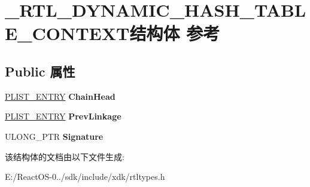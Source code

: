 \hypertarget{struct___r_t_l___d_y_n_a_m_i_c___h_a_s_h___t_a_b_l_e___c_o_n_t_e_x_t}{}\section{\+\_\+\+R\+T\+L\+\_\+\+D\+Y\+N\+A\+M\+I\+C\+\_\+\+H\+A\+S\+H\+\_\+\+T\+A\+B\+L\+E\+\_\+\+C\+O\+N\+T\+E\+X\+T结构体 参考}
\label{struct___r_t_l___d_y_n_a_m_i_c___h_a_s_h___t_a_b_l_e___c_o_n_t_e_x_t}
\subsection*{Public 属性}
\begin{DoxyCompactItemize}
\item 
\mbox{\label{struct___r_t_l___d_y_n_a_m_i_c___h_a_s_h___t_a_b_l_e___c_o_n_t_e_x_t_a528438bcb50b42051d2e3e70c091b560}} 
\hyperlink{struct___l_i_s_t___e_n_t_r_y}{P\+L\+I\+S\+T\+\_\+\+E\+N\+T\+RY} {\bfseries Chain\+Head}
\item 
\mbox{\label{struct___r_t_l___d_y_n_a_m_i_c___h_a_s_h___t_a_b_l_e___c_o_n_t_e_x_t_aafe119eb97c5b1dbaae92ec36bd0de3e}} 
\hyperlink{struct___l_i_s_t___e_n_t_r_y}{P\+L\+I\+S\+T\+\_\+\+E\+N\+T\+RY} {\bfseries Prev\+Linkage}
\item 
\mbox{\label{struct___r_t_l___d_y_n_a_m_i_c___h_a_s_h___t_a_b_l_e___c_o_n_t_e_x_t_a292e4d0d86fbee0ed58dbffc3f24077a}} 
U\+L\+O\+N\+G\+\_\+\+P\+TR {\bfseries Signature}
\end{DoxyCompactItemize}


该结构体的文档由以下文件生成\+:\begin{DoxyCompactItemize}
\item 
E\+:/\+React\+O\+S-\/0../sdk/include/xdk/rtltypes.\+h\end{DoxyCompactItemize}
